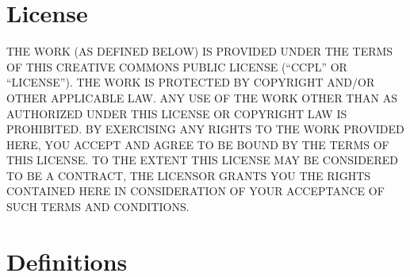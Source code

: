 
\section*{License}
THE WORK (AS DEFINED BELOW) IS PROVIDED UNDER THE TERMS OF THIS CREATIVE COMMONS PUBLIC LICENSE
(``CCPL'' OR ``LICENSE'').
THE WORK IS PROTECTED BY COPYRIGHT AND/OR OTHER APPLICABLE LAW.
ANY USE OF THE WORK OTHER THAN AS AUTHORIZED UNDER THIS LICENSE OR COPYRIGHT LAW IS PROHIBITED.
BY EXERCISING ANY RIGHTS TO THE WORK PROVIDED HERE,
YOU ACCEPT AND AGREE TO BE BOUND BY THE TERMS OF THIS LICENSE.
TO THE EXTENT THIS LICENSE MAY BE CONSIDERED TO BE A CONTRACT,
THE LICENSOR GRANTS YOU THE RIGHTS CONTAINED HERE IN CONSIDERATION OF
YOUR ACCEPTANCE OF SUCH TERMS AND CONDITIONS.


\section{Definitions}
